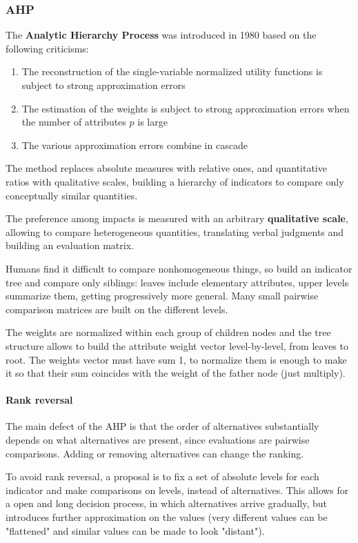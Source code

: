 \subsubsection{AHP}

The \textbf{Analytic Hierarchy Process} was introduced in 1980 based on the following criticisms:
\begin{enumerate}
	\item The reconstruction of the single-variable normalized utility functions is subject to strong approximation errors
	
	\item The estimation of the weights is subject to strong approximation errors when the number of attributes $p$ is large
	
	\item The various approximation errors combine in cascade
\end{enumerate}

The method replaces absolute measures with relative ones, and quantitative ratios with qualitative scales, building a hierarchy of indicators to compare only conceptually similar quantities.

The preference among impacts is measured with an arbitrary \textbf{qualitative scale}, allowing to compare heterogeneous quantities, translating verbal judgments and building an evaluation matrix. 

Humans find it difficult to compare nonhomogeneous things, so build an indicator tree and compare only siblings: leaves include elementary attributes, upper levels summarize them, getting progressively more general. Many small pairwise comparison matrices are built on the different levels.

The weights are normalized within each group of children nodes and the tree structure allows to build the attribute weight vector level-by-level, from leaves to root. The weights vector must have sum 1, to normalize them is enough to make it so that their sum coincides with the weight of the father node (just multiply).

\paragraph{Rank reversal} The main defect of the AHP is that the order of alternatives substantially depends on what alternatives are present, since evaluations are pairwise comparisons. Adding or removing alternatives can change the ranking.

To avoid rank reversal, a proposal is to fix a set of absolute levels for each indicator and make comparisons on levels, instead of alternatives. This allows for a open and long decision process, in which alternatives arrive gradually, but introduces further approximation on the values (very different values can be "flattened" and similar values can be made to look "distant").

